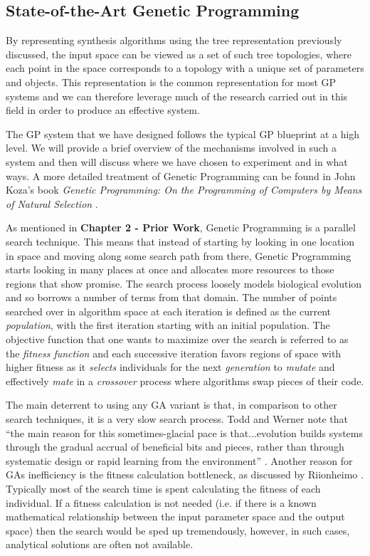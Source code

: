 \documentclass[a4paper,12pt]{report} 	%
\numberwithin{figure}{chapter}
\numberwithin{table}{chapter}
\numberwithin{equation}{chapter}
\begin{document}
\begin{flushleft}
\subsection{State-of-the-Art Genetic Programming}
By representing synthesis algorithms using the tree representation previously discussed, the input space can be viewed as a set of such tree topologies, where each point in the space corresponds to a topology with a unique set of parameters and objects. This representation is the common representation for most GP systems and we can therefore leverage much of the research carried out in this field in order to produce an effective system.

The GP system that we have designed follows the typical GP blueprint at a high level. We will provide a brief overview of the mechanisms involved in such a system and then will discuss where we have chosen to experiment and in what ways. A more detailed treatment of Genetic Programming can be found in John Koza's book \emph{Genetic Programming: On the Programming of Computers by Means of Natural Selection} \cite{Koza:1992gp}.

As mentioned in \textbf{Chapter 2 - Prior Work}, Genetic Programming is a parallel search technique. This means that instead of starting by looking in one location in space and moving along some search path from there, Genetic Programming starts looking in many places at once and allocates more resources to those regions that show promise. The search process loosely models biological evolution and so borrows a number of terms from that domain. The number of points searched over in algorithm space at each iteration is defined as the current \emph{population}, with the first iteration starting with an initial population. The objective function that one wants to maximize over the search is referred to as the \emph{fitness function} and each successive iteration favors regions of space with higher fitness as it \emph{selects} individuals for the next \emph{generation} to \emph{mutate} and effectively \emph{mate} in a  \emph{crossover} process where algorithms swap pieces of their code. 

The main deterrent to using any GA variant is that, in comparison to other search techniques, it is a very slow search process. Todd and Werner note that ``the main reason for this sometimes-glacial pace is that...evolution builds systems through the gradual accrual of beneficial bits and pieces, rather than through systematic design or rapid learning from the environment'' \cite[p. 5]{Todd:1998tg}. Another reason for GAs inefficiency is the fitness calculation bottleneck, as discussed by Riionheimo \cite[p.10]{Riionheimo:2003qo}. Typically most of the search time is spent calculating the fitness of each individual. If a fitness calculation is not needed (i.e. if there is a known mathematical relationship between the input parameter space and the output space) then the search would be sped up tremendously, however, in such cases, analytical solutions are often not available.


\end{flushleft}
\end{document}
